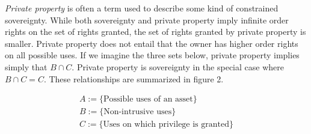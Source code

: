 \newpage
\textit{Private property} is often a term used to describe some kind of constrained sovereignty. While both sovereignty and private property imply infinite order rights on the set of rights granted, the set of rights granted by private property is smaller. Private property does not entail that the owner has higher order rights on all possible uses. If we imagine the three sets below, private property implies simply that $B \cap C$. Private property is sovereignty in the special case where $B\cap C=C$. These relationships are summarized in figure 2.


\begin{align*}
A:=\{ \text{Possible uses of an asset} \} \\
B:=\{\text{Non-intrusive uses} \} \\
C:=\{\text{Uses on which privilege is granted}\}
\end{align*}




